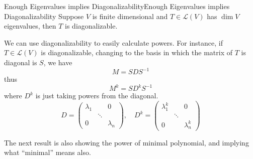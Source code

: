 \documentclass[../main.tex]{subfiles}
\begin{document}
\begin{corollary}{Enough Eigenvalues implies Diagonalizability}{Enough Eigenvalues implies Diagonalizability}
Suppose $V$ is finite dimensional and $T\in \mathscr{L}(V)$ has  $\dim V$ eigenvalues, then $T$ is diagonalizable.
\end{corollary}

We can use diagonalizability to easily calculate powers. For instance, if $T\in \mathscr{L}(V)$ is diagonalizable, changing to the basis in which the matrix of $T$ is diagonal is $S$, we have
\begin{equation}
M = SDS^{-1}
\end{equation}
thus
\begin{equation*}
M^k = SD^kS^{-1}
\end{equation*}
where $D^k$ is just taking powers from the diagonal.
\begin{equation*}
D = 
\begin{pmatrix}
	\lambda_1& &0\\
		 &\ddots &\\
	0&&\lambda_n
\end{pmatrix}
, \quad D^k=
\begin{pmatrix}
	\lambda_1^k&&0\\
		   &\ddots &\\
	0&&\lambda_n^k
\end{pmatrix}
\end{equation*}

The next result is also showing the power of minimal polynomial, and implying what ``minimal'' means also.
\end{document}
